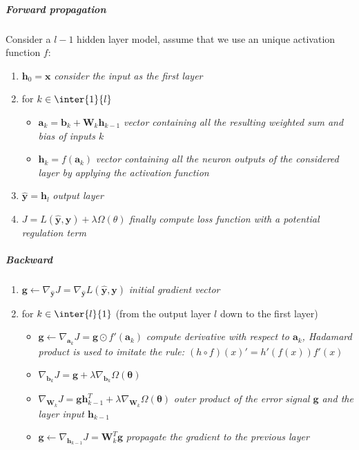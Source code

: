 \subparagraph{Forward propagation}
Consider a $l-1$ hidden layer model, assume that we use an unique activation function $f$:
\begin{enumerate}
    \item $\bm{h}_{0} = \bm{x}$ \textit{consider the input as the first layer}
    \item for $k \in \inter{1}{l}$ 
        \begin{itemize}
            \item $\bm{a}_{k} = \bm{b}_{k} + \bm{W}_{k}\bm{h}_{k-1}$  \textit{vector containing all 
                the resulting weighted sum and bias of inputs $k$}
            \item $\bm{h}_{k} = f(\bm{a}_{k})$ \textit{vector containing all the neuron outputs of 
                the considered layer by applying the activation function}
        \end{itemize}
    \item $\hat{\bm{y}} = \bm{h}_{l}$ \textit{output layer}
    \item $J = L(\hat{\bm{y}}, \bm{y}) + \lambda\Omega(\theta)$ \textit{finally compute loss 
        function with a potential regulation term}
        
\end{enumerate}

\subparagraph{Backward}
\begin{enumerate}
    \item $\bm{g} \leftarrow \nabla_{\hat{\bm{y}}}J = \nabla_{\hat{\bm{y}}}L(
        \hat{\bm{y}}, \bm{y})$ \textit{initial gradient vector}
    \item for $k\in\inter{l}{1}$ (from the output layer $l$ down to the first layer)
        \begin{itemize}
            \item $\bm{g} \leftarrow \nabla_{\bm{a}_{k}}J = \bm{g}\odot f'(\bm{a}_{k})$
                \textit{compute derivative with respect to $\bm{a}_{k}$, Hadamard product is used to imitate the rule: $\left(h\circ f\right)(x)' = h'\left(f(x)\right)f'(x)$}
            \item $\nabla_{\bm{b}_{k}}J = \bm{g} +
                \lambda\nabla_{\bm{b}_{k}}\Omega(\bm{\theta})$
            \item $\nabla_{\bm{W}_{k}}J = \bm{g}\bm{h}^{T}_{k-1}
                + \lambda\nabla_{\bm{W}_{k}}\Omega(\bm{\theta})$ \textit{outer product
                of the error signal $\bm{g}$ and the layer input $\bm{h}_{k-1}$}
            \item $\bm{g} \leftarrow \nabla_{\bm{h}_{k-1}}J = \bm{W}_{k}^{T}\bm{g}$
                \textit{propagate the gradient to the previous layer}
        \end{itemize}
        
\end{enumerate}


